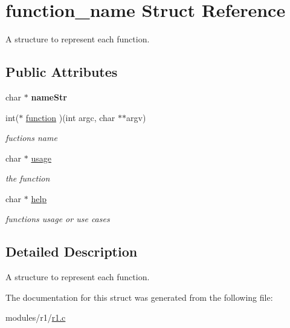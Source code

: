 \hypertarget{structfunction__name}{}\section{function\+\_\+name Struct Reference}
\label{structfunction__name}


A structure to represent each function.  


\subsection*{Public Attributes}
\begin{DoxyCompactItemize}
\item 
char $\ast$ {\bfseries name\+Str}\hypertarget{structfunction__name_a7a94f7f31542a15b63160b6b213e0bcb}{}\label{structfunction__name_a7a94f7f31542a15b63160b6b213e0bcb}

\item 
int($\ast$ \hyperlink{structfunction__name_ad80214b3eea6c438c13ff5461c5350ab}{function} )(int argc, char $\ast$$\ast$argv)\hypertarget{structfunction__name_ad80214b3eea6c438c13ff5461c5350ab}{}\label{structfunction__name_ad80214b3eea6c438c13ff5461c5350ab}

\begin{DoxyCompactList}\small\item\em fuction\textquotesingle{}s name \end{DoxyCompactList}\item 
char $\ast$ \hyperlink{structfunction__name_a30f593e52febda0cc9d9703b9015fb0f}{usage}\hypertarget{structfunction__name_a30f593e52febda0cc9d9703b9015fb0f}{}\label{structfunction__name_a30f593e52febda0cc9d9703b9015fb0f}

\begin{DoxyCompactList}\small\item\em the function \end{DoxyCompactList}\item 
char $\ast$ \hyperlink{structfunction__name_ac0f73e570d7d03a9f378a70e6d4d5632}{help}\hypertarget{structfunction__name_ac0f73e570d7d03a9f378a70e6d4d5632}{}\label{structfunction__name_ac0f73e570d7d03a9f378a70e6d4d5632}

\begin{DoxyCompactList}\small\item\em function\textquotesingle{}s usage or use cases \end{DoxyCompactList}\end{DoxyCompactItemize}


\subsection{Detailed Description}
A structure to represent each function. 

The documentation for this struct was generated from the following file\+:\begin{DoxyCompactItemize}
\item 
modules/r1/\hyperlink{r1_8c}{r1.\+c}\end{DoxyCompactItemize}
